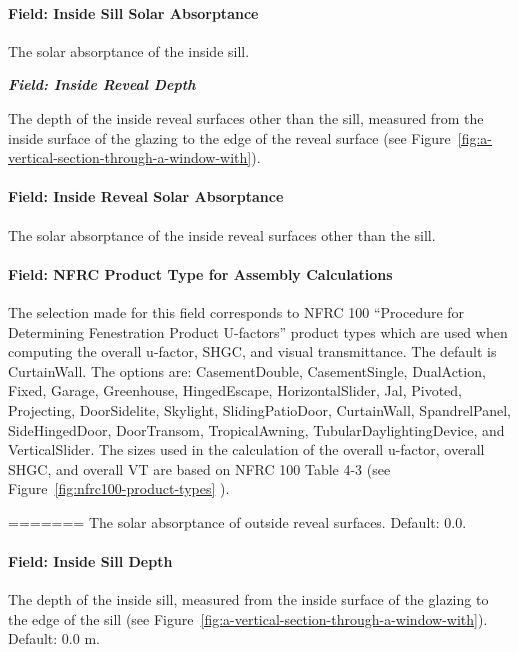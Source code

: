 \paragraph{Field: Inside Sill Solar Absorptance}\label{field-inside-sill-solar-absorptance}

The solar absorptance of the inside sill.

\textbf{\emph{Field: Inside Reveal Depth}}

The depth of the inside reveal surfaces other than the sill, measured from the inside surface of the glazing to the edge of the reveal surface (see Figure~\ref{fig:a-vertical-section-through-a-window-with}).

\paragraph{Field: Inside Reveal Solar Absorptance}\label{field-inside-reveal-solar-absorptance}

The solar absorptance of the inside reveal surfaces other than the sill.

\paragraph{Field: NFRC Product Type for Assembly Calculations}\label{field-nfrc-product-type-for-assembly-calculations}

The selection made for this field corresponds to NFRC 100 ``Procedure for Determining Fenestration Product U-factors'' product types which are used when computing the overall u-factor, SHGC, and visual transmittance. The default is CurtainWall. The options are: CasementDouble, CasementSingle, DualAction, Fixed, Garage, Greenhouse, HingedEscape, HorizontalSlider, Jal, Pivoted, Projecting, DoorSidelite, Skylight, SlidingPatioDoor, CurtainWall, SpandrelPanel, SideHingedDoor, DoorTransom, TropicalAwning, TubularDaylightingDevice, and VerticalSlider. The sizes used in the calculation of the overall u-factor, overall SHGC, and overall VT are based on NFRC 100 Table 4-3 (see Figure~\ref{fig:nfrc100-product-types} ).

=======
The solar absorptance of outside reveal surfaces. Default: 0.0.

\paragraph{Field: Inside Sill Depth}\label{field-inside-sill-depth}

The depth of the inside sill, measured from the inside surface of the glazing to the edge of the sill (see Figure~\ref{fig:a-vertical-section-through-a-window-with}). Default: 0.0 m.

